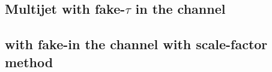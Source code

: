 

\subsection{Multijet with fake-$\tau$ in the \hadhad channel}
\label{subsec:HadHadmultijet}




%

\subsection{\ttbar with fake-\tauhad in the \hadhad channel with scale-factor method}
\label{sec:ttbarfake_hadhad_sf_method}


